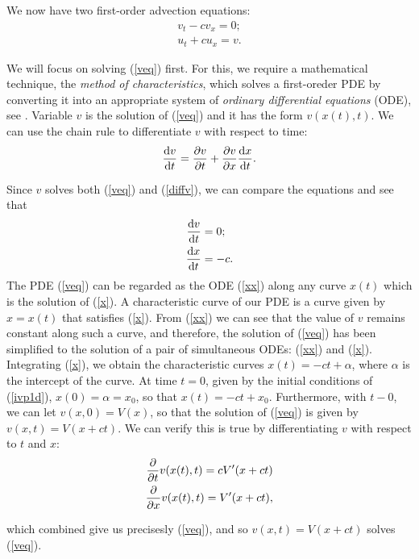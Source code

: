 \documentclass[a4paper, 12pt]{article}
\numberwithin{equation}{section}
\begin{document}
We now have two first-order advection equations:
\begin{align}
    v_t-cv_x=0 \label{veq};\\
    u_t+cu_x=v \label{ueq}.
\end{align}

We will focus on solving (\ref{veq}) first. For this, we require a mathematical
technique, the \emph{method of characteristics}, which solves a first-oreder PDE by
converting it into an appropriate system of \emph{ordinary differential equations}
(ODE), see \cite[Ch. 2.1, Ch. 3.2]{Ev}. Variable $v$ is the solution of
(\ref{veq}) and it has the form $v(x(t), t)$. We can use the chain rule to
differentiate $v$ with respect to time:
\begin{equation} \label{diffv}
    \diff{v}{t}=\diffp[1]{v}{t}+\diffp[1]{v}{x}\diff{x}{t}.
\end{equation}

Since $v$ solves both (\ref{veq}) and (\ref{diffv}), we can compare the
equations and see that
\begin{align}
    \diff{v}{t}&=0 \label{xx};\\
    \diff{x}{t}&=-c \label{x}.
\end{align}
The PDE (\ref{veq}) can be regarded as the ODE (\ref{xx}) along any curve
$x(t)$ which is the solution of (\ref{x}). A characteristic curve of our PDE is
a curve given by $x=x(t)$ that satisfies (\ref{x}). From (\ref{xx}) we can see
that the value of $v$ remains constant along such a curve, and therefore, the
solution of (\ref{veq}) has been simplified to the solution of a pair of
simultaneous ODEs: (\ref{xx}) and (\ref{x}). Integrating (\ref{x}), we obtain
the characteristic curves $x(t)=-ct+\alpha$, where $\alpha$ is the intercept of
the curve. At time $t=0$, given by the initial conditions of (\ref{ivp1d}),
$x(0)=\alpha=x_0$, so that $x(t)=-ct+x_0$. Furthermore, with $t-0$, we can let
$v(x,0)=V(x)$, so that the solution of (\ref{veq}) is given by $v(x,t)=V(x+ct)$.
We can verify this is true by differentiating $v$ with respect to $t$ and $x$:
\begin{equation*} 
    \begin{aligned}
    \diffp[1]{}{t}v(x(t), t)=cV'(x+ct)\\
    \diffp[1]{}{x}v(x(t), t)=V'(x+ct),
    \end{aligned}
\end{equation*}

which combined give us precisesly (\ref{veq}), and so $v(x,t)=V(x+ct)$ solves
(\ref{veq}). \\
\end{document}
